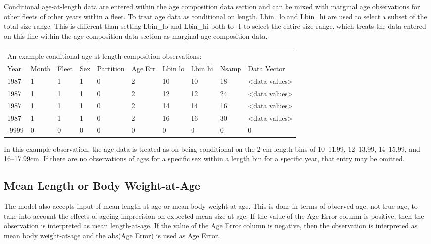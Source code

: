 Conditional age-at-length data are entered within the age composition data section and can be mixed with marginal age observations for other fleets of other years within a fleet. To treat age data as conditional on length, Lbin\_lo and Lbin\_hi are used to select a subset of the total size range. This is different than setting Lbin\_lo and Lbin\_hi both to -1 to select the entire size 
range, which treats the data entered on this line within the age composition data section as marginal age
composition data. 

\begin{tabular}{p{0.9cm} p{1cm} p{0.9cm} p{0.9cm} p{1.5cm} p{0.9cm} p{0.9cm} p{0.9cm} p{1cm} p{2.4cm}}
	\multicolumn{10}{l}{ }\\
	\multicolumn{10}{l}{An example conditional age-at-length composition observations:}\\
	\hline
	Year & Month & Fleet & Sex & Partition & Age Err & Lbin lo & Lbin hi & Nsamp & Data Vector \Tstrut\\
	\hline
	1987 & 1 & 1 & 1 & 0 & 2 & 10 & 10 & 18 & <data values>\Tstrut\\
	1987 & 1 & 1 & 1 & 0 & 2 & 12 & 12 & 24 & <data values>\Tstrut\\
	1987 & 1 & 1 & 1 & 0 & 2 & 14 & 14 & 16 & <data values>\Tstrut\\
	1987 & 1 & 1 & 1 & 0 & 2 & 16 & 16 & 30 & <data values>\Tstrut\\
	-9999 & 0 & 0 & 0 & 0 & 0 & 0 & 0 & 0 & 0\Bstrut\\
	\hline
\end{tabular}

In this example observation, the age data is treated as on being conditional on the 2 cm length bins of 10--11.99, 12--13.99, 14--15.99, and 16--17.99cm. If there are no observations of ages for a specific sex within a length bin for a specific year, that entry may be omitted.

\subsection{Mean Length or Body Weight-at-Age}
The model also accepts input of mean length-at-age or mean body weight-at-age.  This is done in terms of observed age, not true age, to take into account the effects of ageing imprecision on expected mean size-at-age.  If the value of the Age Error column is positive, then the observation is interpreted as mean length-at-age.  If the value of the Age Error column is negative, then the observation is interpreted as mean body weight-at-age and the abs(Age Error) is used as Age Error.

